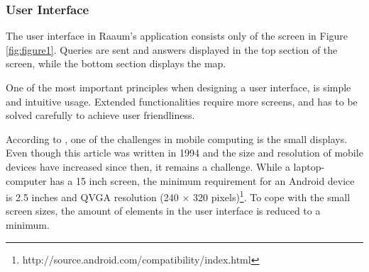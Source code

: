 \subsubsection{User Interface}
The user interface in Raaum's application consists only of the screen in Figure \ref{fig:figure1}. Queries are sent and answers displayed in the top section of the screen, while the bottom section displays the map.

One of the most important principles when designing a user interface, is simple and intuitive usage. Extended functionalities require more screens, and has to be solved carefully to achieve user friendliness.

According to \cite{mchallenges}, one of the challenges in mobile computing is the small displays. Even though this article was written in 1994 and the size and resolution of mobile devices have increased since then, it remains a challenge. While a laptop-computer has a 15 inch screen, the minimum requirement for an Android device is 2.5 inches and QVGA resolution (240 $\times$ 320 pixels)\footnote{http://source.android.com/compatibility/index.html}. To cope with the small screen sizes, the amount of elements in the user interface is reduced to a minimum.

